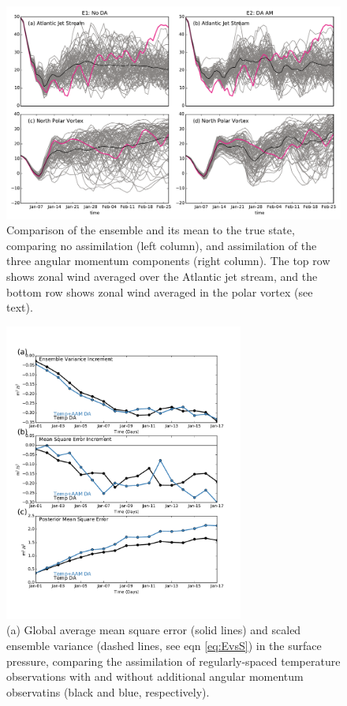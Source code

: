  \begin{figure}
	 \includegraphics[width=\textwidth]{Paper_figures/ERPDA_paper_point_checks.pdf}
	 \caption{Comparison of the ensemble and its mean to the true state, comparing no assimilation (left column), and assimilation of the three angular momentum components (right column). The top row shows zonal wind averaged over the Atlantic jet stream, and the bottom row shows zonal wind averaged in the polar vortex (see text).}
	 \label{fig:point_checks}
\end{figure}


 \begin{figure}
	 \includegraphics[width=0.7\textwidth]{Paper_figures/ERPDA_paper_MSE_RST_vs_ERPRST_global.pdf}
	 \caption{(a) Global average mean square error (solid lines) and scaled ensemble variance (dashed lines, see eqn \ref{eq:EvsS}) in the surface pressure, comparing the assimilation of regularly-spaced temperature observations with and without additional angular momentum observatins (black and blue, respectively).}
	 \label{fig:added_value_MSE}
\end{figure}

